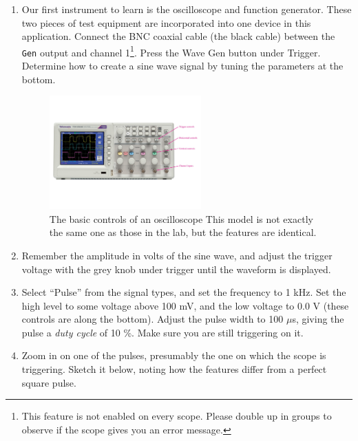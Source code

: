 \documentclass{article}
\begin{document}
\begin{enumerate}
\item Our first instrument to learn is the oscilloscope and function generator.  These two pieces of test equipment are incorporated into one device in this application.  Connect the BNC coaxial cable (the black cable) between the \verb+Gen+ output and channel 1\footnote{This feature is not enabled on every scope.  Please double up in groups to observe if the scope gives you an error message.}.  Press the Wave Gen button under Trigger.  Determine how to create a sine wave signal by tuning the parameters at the bottom.
\begin{figure}
\centering
\includegraphics[width=0.55\textwidth,trim=0cm 5cm 0cm 5cm,clip=true]{Scope.pdf}
\caption{\label{fig:scope} The basic controls of an oscilloscope  This model is not exactly the same one as those in the lab, but the features are identical.}
\end{figure}
\item Remember the amplitude in volts of the sine wave, and adjust the trigger voltage with the grey knob under trigger until the waveform is displayed.
\item Select ``Pulse'' from the signal types, and set the frequency to 1 kHz.  Set the high level to some voltage above 100 mV, and the low voltage to 0.0 V (these controls are along the bottom).  Adjust the pulse width to 100 $\mu$s, giving the pulse a \textit{duty cycle} of 10 \%.  Make sure you are still triggering on it.
\item Zoom in on one of the pulses, presumably the one on which the scope is triggering.  Sketch it below, noting how the features differ from a perfect square pulse.
\end{enumerate}
\end{document}
